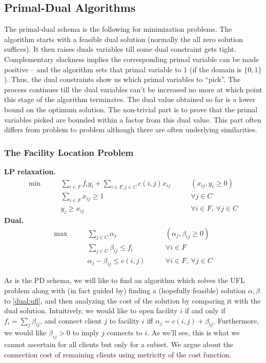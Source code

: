 \documentclass[11pt]{article}
\begin{document}
\subsection*{Primal-Dual Algorithms}
The primal-dual schema is the following for minimization problems. The algorithm starts with a feasible dual solution (normally the all zero solution suffices). It then raises duals variables till some dual constraint gets tight. Complementary slackness implies the corresponding primal variable can be made positive -- and the algorithm sets that primal variable to $1$ (if the domain is $\{0,1\}$). Thus, the dual constraints show us which primal variables to ``pick''. The process continues till the dual variables can't be increased no more at which point this stage of the algorithm terminates. The dual value obtained so far is a lower bound on the optimum solution.
The non-trivial part is to prove that the primal variables picked are bounded within a factor from this dual value. 
This part often differs from problem to problem although there are often underlying similarities. 

\subsubsection*{The Facility Location Problem}
\noindent
{\bf LP relaxation.} 
\begin{align}
\min & \qquad \sum_{i\in F}f_iy_i + \sum_{i\in F,j\in C} c(i,j)x_{ij} & \qquad (x_{ij},y_i \ge 0) \label{lp:ufl} \\
 & \qquad \sum_{i\in F} x_{ij} \ge 1 & \qquad \forall j\in C \label{eq:client} \\
			     & \qquad y_i \ge x_{ij} & \qquad \forall i\in F,~\forall j\in C \label{eq:fac-client}	 
\end{align}
\noindent
{\bf Dual.}
\begin{align}
\max & \qquad \sum_{j\in C}\alpha_j  & \qquad (\alpha_j, \beta_{ij} \ge 0) \label{dual:ufl}\\
 & \qquad \sum_{j\in C} \beta_{ij} \le f_i & \qquad \forall i\in F \label{eq:fac-cost} \\
			     & \qquad \alpha_j -\beta_{ij} \le c(i,j) & \qquad \forall i\in F,~\forall j\in C \label{eq:client-cost}\end{align}
			     
As is the PD schema, we will like to find an algorithm which solves the UFL problem along with (in fact guided by) finding a (hopefully feasible) solution  $\alpha, \beta$ to \eqref{dual:ufl}, and then analyzing the cost of the solution by comparing it with the dual solution. Intuitively, we would like to open facility $i$ if and only if 
$f_i = \sum_j \beta_{ij}$, and connect client $j$ to facility $i$ iff $\alpha_j = c(i,j) + \beta_{ij}$. 
Furthermore, we would like $\beta_{ij} > 0$ to imply $j$ connects to $i$. As we'll see, this is what we cannot
ascertain for all clients but only for a subset. We argue about the connection cost of remaining clients 
using metricity of the cost function. \\
\end{document}
